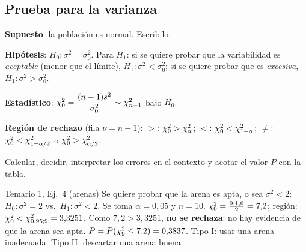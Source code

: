 \subsection{Prueba para la varianza}\label{p:pvar}
\begin{pasos}
\begin{pasolista}
\item \textbf{Supuesto}: la población es normal. Escribilo.
\item \textbf{Hipótesis}: $H_0:\sigma^2=\sigma_0^2$. Para $H_1$: si se quiere probar que la variabilidad es \emph{aceptable} (menor que el límite), $H_1:\sigma^2<\sigma_0^2$; si se quiere probar que es \emph{excesiva}, $H_1:\sigma^2>\sigma_0^2$.
\item \textbf{Estadístico}: $\chi^2_0=\dfrac{(n-1)s^2}{\sigma_0^2}\sim\chi^2_{n-1}$ bajo $H_0$.
\item \textbf{Región de rechazo} (fila $\nu=n-1$): $>$: $\chi^2_0>\chi^2_{\alpha}$; \quad $<$: $\chi^2_0<\chi^2_{1-\alpha}$; \quad $\neq$: $\chi^2_0<\chi^2_{1-\alpha/2}$ o $\chi^2_0>\chi^2_{\alpha/2}$.
\item Calcular, decidir, interpretar los errores en el contexto y acotar el valor $P$ con la tabla.
\end{pasolista}
\end{pasos}
\begin{modelo}{Temario 1, Ej.\ 4 (arenas)}
Se quiere probar que la arena es apta, o sea $\sigma^2<2$: $H_0:\sigma^2=2$ vs.\ $H_1:\sigma^2<2$. Se toma $\alpha=0{,}05$ y $n=10$.
$\chi^2_0=\frac{9\cdot1{,}6}{2}=7{,}2$; región: $\chi^2_0<\chi^2_{0,95;9}=3{,}3251$. Como $7{,}2>3{,}3251$, \textbf{no se rechaza}: no hay evidencia de que la arena sea apta. $P=P(\chi^2_9\le7{,}2)=0{,}3837$.
Tipo I: usar una arena inadecuada. Tipo II: descartar una arena buena.
\end{modelo}

